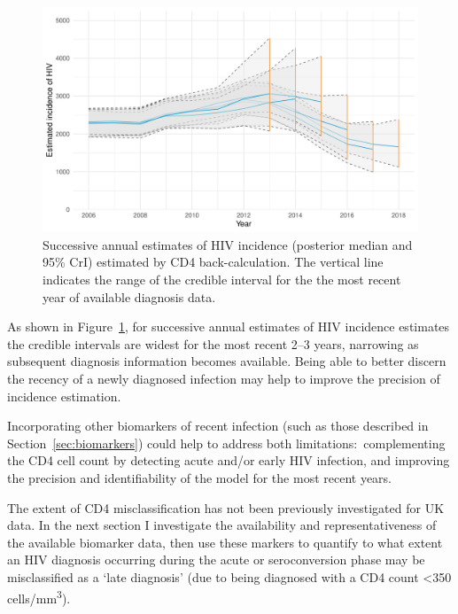 \begin{figure}[htbp!]
  \centering
  \includegraphics[width=\textwidth]{incidence_overlay_2014_2018.pdf}
  \caption[Successive annual estimates of HIV incidence (posterior median and 95\% CrI) estimated by CD4 back-calculation]{Successive annual estimates of HIV incidence (posterior median and 95\% CrI) estimated by CD4 back-calculation. The vertical line indicates the range of the credible interval for the the most recent year of available diagnosis data.}\label{fig:wideintervals}
\end{figure}

As shown in Figure~\ref{fig:wideintervals}, for successive annual estimates of HIV incidence estimates the credible intervals are widest for the most recent 2--3 years, narrowing as subsequent diagnosis information becomes available. Being able to better discern the recency of a newly diagnosed infection may help to improve the precision of incidence estimation.
\newline

Incorporating other biomarkers of recent infection (such as those described in Section~\ref{sec:biomarkers}) could help to address both limitations:\ complementing the CD4 cell count by detecting acute and/or early HIV infection, and improving the precision and identifiability of the model for the most recent years.

The extent of CD4 misclassification has not been previously investigated for UK data. In the next section I investigate the availability and representativeness of the available biomarker data, then use these markers to quantify to what extent an HIV diagnosis occurring during the acute or seroconversion phase may be misclassified as a `late diagnosis' (due to being diagnosed with a CD4 count <350 cells/mm\textsuperscript{3}).

